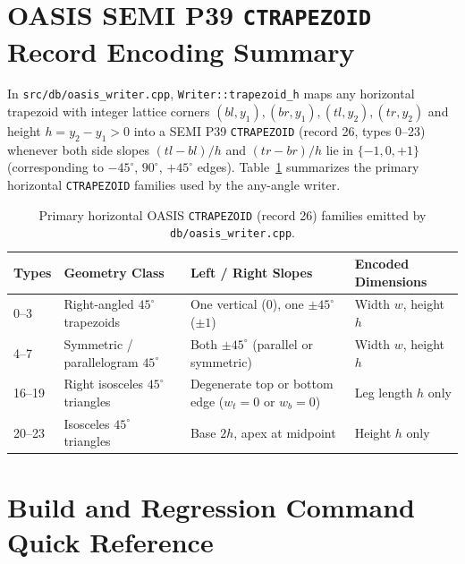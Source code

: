 \section{OASIS SEMI P39 \texttt{CTRAPEZOID} Record Encoding Summary}

In \texttt{src/db/oasis\_writer.cpp}, \texttt{Writer::trapezoid\_h} maps any horizontal trapezoid with integer lattice corners $(bl, y_1), (br, y_1), (tl, y_2), (tr, y_2)$ and height $h = y_2 - y_1 > 0$ into a SEMI P39 \texttt{CTRAPEZOID} (record 26, types 0--23) whenever both side slopes $(tl - bl)/h$ and $(tr - br)/h$ lie in $\{-1, 0, +1\}$ (corresponding to $-45^\circ$, $90^\circ$, $+45^\circ$ edges). Table~\ref{tab:ctrap_types} summarizes the primary horizontal \texttt{CTRAPEZOID} families used by the any-angle writer.

\begin{table}[htbp]
\centering
\caption{Primary horizontal OASIS \texttt{CTRAPEZOID} (record 26) families emitted by \texttt{db/oasis\_writer.cpp}.}
\label{tab:ctrap_types}
\small
\begin{tabular}{@{}llll@{}}
\toprule
\textbf{Types} & \textbf{Geometry Class} & \textbf{Left / Right Slopes} & \textbf{Encoded Dimensions} \\
\midrule
0--3 & Right-angled $45^\circ$ trapezoids & One vertical ($0$), one $\pm 45^\circ$ ($\pm 1$) & Width $w$, height $h$ \\
4--7 & Symmetric / parallelogram $45^\circ$ & Both $\pm 45^\circ$ (parallel or symmetric) & Width $w$, height $h$ \\
16--19 & Right isosceles $45^\circ$ triangles & Degenerate top or bottom edge ($w_t=0$ or $w_b=0$) & Leg length $h$ only \\
20--23 & Isosceles $45^\circ$ triangles & Base $2h$, apex at midpoint & Height $h$ only \\
\bottomrule
\end{tabular}
\end{table}

\section{Build and Regression Command Quick Reference}

